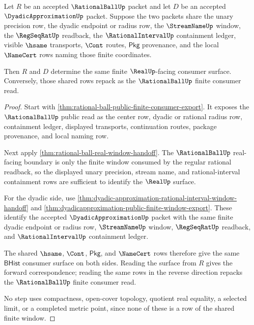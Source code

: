 \begin{theorem}
\label{thm:rationalball-dyadicapproximation-window-correspondence}
Let $R$ be an accepted $\RationalBallUp$ packet and let $D$ be an accepted
$\DyadicApproximationUp$ packet. Suppose the two packets share the unary
precision row, the dyadic endpoint or radius row, the $\StreamNameUp$ window,
the $\RegSeqRatUp$ readback, the $\RationalIntervalUp$ containment ledger,
visible $\hsame$ transports, $\Cont$ routes, $\mathsf{Pkg}$ provenance, and the
local $\NameCert$ rows naming those finite coordinates.

Then $R$ and $D$ determine the same finite $\RealUp$-facing consumer surface.
Conversely, those shared rows repack as the $\RationalBallUp$ finite consumer
read.
\end{theorem}
\begin{proof}
Start with
\autoref{thm:rational-ball-public-finite-consumer-export}. It exposes the
$\RationalBallUp$ public read as the center row, dyadic or rational radius row,
containment ledger, displayed transports, continuation routes, package
provenance, and local naming row.

Next apply \autoref{thm:rational-ball-real-window-handoff}. The
$\RationalBallUp$ real-facing boundary is only the finite window consumed by
the regular rational readback, so the displayed unary precision, stream name,
and rational-interval containment rows are sufficient to identify the
$\RealUp$ surface.

For the dyadic side, use
\autoref{thm:dyadic-approximation-rational-interval-window-handoff} and
\autoref{thm:dyadicapproximation-public-finite-window-export}. These identify
the accepted $\DyadicApproximationUp$ packet with the same finite dyadic
endpoint or radius row, $\StreamNameUp$ window, $\RegSeqRatUp$ readback, and
$\RationalIntervalUp$ containment ledger.

The shared $\hsame$, $\Cont$, $\mathsf{Pkg}$, and $\NameCert$ rows therefore
give the same $\mathsf{BHist}$ consumer surface on both sides. Reading the
surface from $R$ gives the forward correspondence; reading the same rows in
the reverse direction repacks the $\RationalBallUp$ finite consumer read.

No step uses compactness, open-cover topology, quotient real equality, a
selected limit, or a completed metric point, since none of these is a row of
the shared finite window.
\end{proof}

